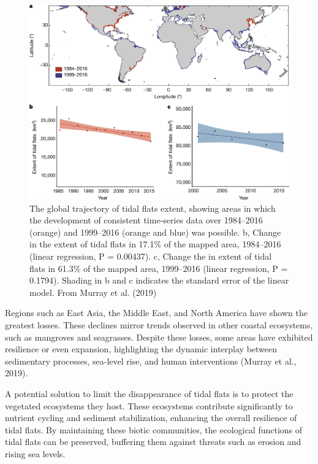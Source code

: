 \documentclass[
  letterpaper,
  11pt,
  english,
  singlespacing,
  headsepline]{MastersDoctoralThesis}
\begin{document}
\begin{spacing}{1.5}
\begin{figure}
{\includegraphics[width=1\linewidth,height=\textheight,keepaspectratio]{Chapter1/Figs/Murray_Tidalflats.png}

}

\caption{\label{fig-TidalFlats}The global trajectory of tidal flats
extent, showing areas in which the development of consistent time-series
data over 1984--2016 (orange) and 1999--2016 (orange and blue) was
possible. b, Change in the extent of tidal flats in 17.1\% of the mapped
area, 1984--2016 (linear regression, P = 0.00437). c, Change the in
extent of tidal flats in 61.3\% of the mapped area, 1999--2016 (linear
regression, P = 0.1794). Shading in b and c indicates the standard error
of the linear model. From Murray et al. (2019)}

\end{figure}%

Regions such as East Asia, the Middle East, and North America have shown
the greatest losses. These declines mirror trends observed in other
coastal ecosystems, such as mangroves and seagrasses. Despite these
losses, some areas have exhibited resilience or even expansion,
highlighting the dynamic interplay between sedimentary processes,
sea-level rise, and human interventions (Murray et al., 2019).

A potential solution to limit the disappearance of tidal flats is to
protect the vegetated ecosystems they host. These ecosystems contribute
significantly to nutrient cycling and sediment stabilization, enhancing
the overall resilience of tidal flats. By maintaining these biotic
communities, the ecological functions of tidal flats can be preserved,
buffering them against threats such as erosion and rising sea levels.


\end{spacing}
\end{document}
